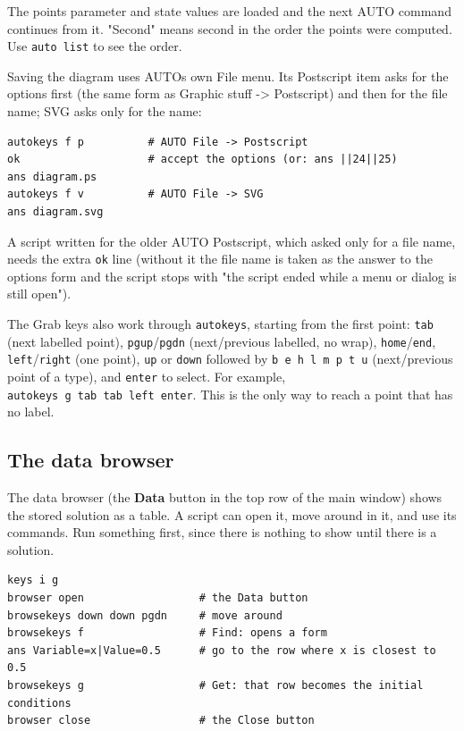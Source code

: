\documentclass{article}
\begin{document}
The point\textquotesingle s parameter and state values are loaded and the next AUTO
command continues from it. "Second" means second in the order the points
were computed. Use \texttt{auto\ list} to see the order.

Saving the diagram uses AUTO\textquotesingle s own File menu. Its Postscript item
asks for the options first (the same form as Graphic stuff -\textgreater{}
Postscript) and then for the file name; SVG asks only for the name:

{\small\begin{verbatim}
autokeys f p          # AUTO File -> Postscript
ok                    # accept the options (or: ans ||24||25)
ans diagram.ps
autokeys f v          # AUTO File -> SVG
ans diagram.svg
\end{verbatim}}

A script written for the older AUTO Postscript, which asked only for
a file name, needs the extra \texttt{ok} line (without it the file
name is taken as the answer to the options form and the script stops
with "the script ended while a menu or dialog is still open").

The Grab keys also work through \texttt{autokeys}, starting from
the first point: \texttt{tab} (next labelled point),
\texttt{pgup}/\texttt{pgdn} (next/previous labelled, no wrap),
\texttt{home}/\texttt{end}, \texttt{left}/\texttt{right}
(one point), \texttt{up} or \texttt{down} followed by
\texttt{b\ e\ h\ l\ m\ p\ t\ u} (next/previous point of a type), and
\texttt{enter} to select. For example,
\texttt{autokeys\ g\ tab\ tab\ left\ enter}. This is the only way to
reach a point that has no label.

\subsection{The data browser}\label{scr:7}

The data browser (the \textbf{Data} button in the top row of
the main window) shows the stored solution as a table. A script can open
it, move around in it, and use its commands. Run something first, since
there is nothing to show until there is a solution.

{\small\begin{verbatim}
keys i g
browser open                  # the Data button
browsekeys down down pgdn     # move around
browsekeys f                  # Find: opens a form
ans Variable=x|Value=0.5      # go to the row where x is closest to 0.5
browsekeys g                  # Get: that row becomes the initial conditions
browser close                 # the Close button
\end{verbatim}}
\end{document}
